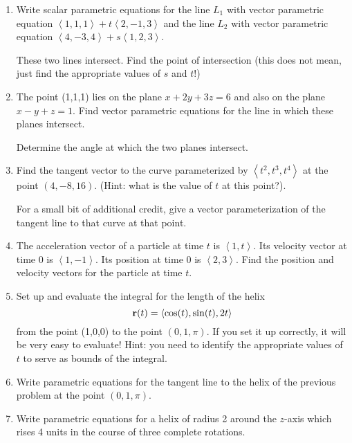 \documentclass[12pt]{article}
\begin{document}
\begin{enumerate}
\newpage

\item  Write scalar parametric equations for the line $L_1$ with vector parametric equation $\left<1,1,1\right>+t\left<2,-1,3\right>$ and the line
$L_2$ with vector parametric equation $\left<4,-3,4\right>+s\left<1,2,3\right>$.

These two lines intersect.  Find the point of intersection (this does not mean, just find the appropriate values of $s$ and $t$!)

\newpage

\item  The point (1,1,1) lies on the plane $x+2y+3z=6$ and also on the plane $x-y+z=1$.  Find vector parametric equations for the line in which these planes intersect.

Determine the angle at which the two planes intersect.

\newpage

 \item Find the tangent vector to the curve parameterized by $\left<t^2,t^3,t^4\right>$ at the point $(4,-8,16)$.  (Hint:  what is the value of $t$ at this point?).

For a small bit of additional credit, give a vector parameterization of the tangent line to that curve at that point.

\newpage

\item  The acceleration vector of a particle at time $t$ is $\left<1,t\right>$.  Its velocity vector at time 0 is $\left<1,-1\right>$.  Its position at time 0 is $\left<2,3\right>$.  Find the position and velocity vectors for the particle at time $t$.
\newpage
\item  Set up and evaluate the integral for the length of the helix $${\bf r}(t) =\left<\cos(t),\sin(t),2t\right>$$ from the point (1,0,0)  to the point $(0,1,\pi)$.  If you set it up correctly, it will be very easy to evaluate!  Hint:  you need to identify the appropriate values of $t$ to serve as bounds of the integral.

\newpage

\item Write parametric equations for the tangent line to the  helix of the previous problem at the point  $(0,1,\pi)$.


\newpage
\item   Write parametric equations for a helix of radius 2 around the $z$-axis which rises 4 units in the course of three complete rotations.

\newpage






\end{enumerate}
\end{document}
